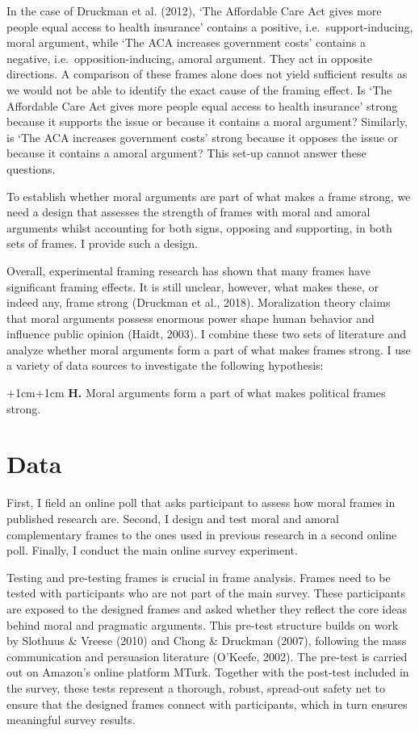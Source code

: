 \documentclass[12pt,econ]{sources/authesis}
\begin{document}
In the case of Druckman et al. (2012), `The Affordable Care Act gives more people equal access to health insurance' contains a positive, i.e.~support-inducing, moral argument, while `The ACA increases government costs' contains a negative, i.e.~opposition-inducing, amoral argument. They act in opposite directions. A comparison of these frames alone does not yield sufficient results as we would not be able to identify the exact cause of the framing effect. Is `The Affordable Care Act gives more people equal access to health insurance' strong because it supports the issue or because it contains a moral argument? Similarly, is `The ACA increases government costs' strong because it opposes the issue or because it contains a amoral argument? This set-up cannot answer these questions.

To establish whether moral arguments are part of what makes a frame strong, we need a design that assesses the strength of frames with moral and amoral arguments whilst accounting for both signs, opposing and supporting, in both sets of frames. I provide such a design.

Overall, experimental framing research has shown that many frames have significant framing effects. It is still unclear, however, what makes these, or indeed any, frame strong (Druckman et al., 2018). Moralization theory claims that moral arguments possess enormous power shape human behavior and influence public opinion (Haidt, 2003). I combine these two sets of literature and analyze whether moral arguments form a part of what makes frames strong. I use a variety of data sources to investigate the following hypothesis:

\vspace{0.3cm}
\begin{adjustwidth*}{+1cm}{+1cm}
\textbf{H.} Moral arguments form a part of what makes political frames strong.
\end{adjustwidth*}
\hypertarget{framing-data}{%
\section{Data}\label{framing-data}}

First, I field an online poll that asks participant to assess how moral frames in published research are. Second, I design and test moral and amoral complementary frames to the ones used in previous research in a second online poll. Finally, I conduct the main online survey experiment.

Testing and pre-testing frames is crucial in frame analysis. Frames need to be tested with participants who are not part of the main survey. These participants are exposed to the designed frames and asked whether they reflect the core ideas behind moral and pragmatic arguments. This pre-test structure builds on work by Slothuus \& Vreese (2010) and Chong \& Druckman (2007), following the mass communication and persuasion literature (O'Keefe, 2002). The pre-test is carried out on Amazon's online platform MTurk. Together with the post-test included in the survey, these tests represent a thorough, robust, spread-out safety net to ensure that the designed frames connect with participants, which in turn ensures meaningful survey results.
\end{document}
